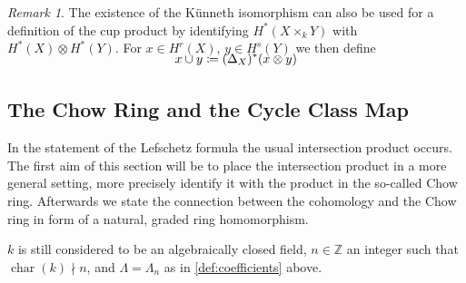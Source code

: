 \documentclass[english]{scrartcl}
\theoremstyle{definition}
\theoremstyle{remark}
\newtheorem{Rem}[Def]{Remark}
\newcommand*{\Z}{\mathds{Z}}
\DeclareMathOperator{\Char}{char} %
\newcommand*{\Diag}[1]{{\Delta_{#1}}} %
\begin{document}
\begin{Rem}\label{rem:cupwithkuennethiso}
  The existence of the Künneth isomorphism can also be used for
  a definition of the cup product by identifying $H^*(X\times_k Y)$
  with $H^*(X)\otimes H^*(Y)$. For $x\in H^r(X)$, $y\in H^s(Y)$
  we then define
  \begin{gather*}
    \SwapAboveDisplaySkip
    x\cup y \coloneqq (\Diag{X})^*(x\otimes y)
  \end{gather*}
\end{Rem}

\subsection{The Chow Ring and the Cycle Class Map}
In the statement of the Lefschetz formula the usual intersection
product occurs. The first aim of this section will be to place the
intersection product in a more general setting, more precisely
identify it with the product in the so-called Chow ring. Afterwards we
state the connection between the cohomology and the Chow ring in form
of a natural, graded ring homomorphism.

$k$ is still considered to be an algebraically closed field,
$n\in\Z$ an integer such that $\Char(k)\nmid n$,
and $\Lambda=\Lambda_n$ as in \ref{def:coefficients} above.
\end{document}
